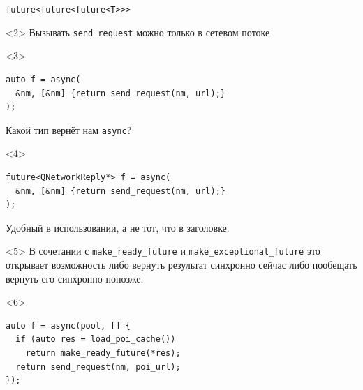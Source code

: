 \documentclass[aspectratio=169,hyperref={unicode},17pt]{beamer}
\begin{document}
\begin{frame}[fragile,t]{\texttt{future<future<future<T>{}>{}>}}
\begin{onlyenv}<2>
Вызывать \texttt{send\_request} можно только в сетевом потоке
\end{onlyenv}
\begin{onlyenv}<3>
\begin{lstlisting}[style=cppcode]
auto f = async(
  &nm, [&nm] {return send_request(nm, url);}
);
\end{lstlisting}
Какой тип вернёт нам \texttt{async}?
\end{onlyenv}
\begin{onlyenv}<4>
\begin{lstlisting}[style=cppcode]
future<QNetworkReply*> f = async(
  &nm, [&nm] {return send_request(nm, url);}
);
\end{lstlisting}
Удобный в использовании, а не тот, что в заголовке.
\end{onlyenv}
\begin{onlyenv}<5>
В сочетании с \texttt{make\_ready\_future} и \texttt{make\_exceptional\_future} это открывает возможность либо вернуть результат синхронно сейчас либо пообещать вернуть его синхронно попозже.
\end{onlyenv}
\begin{onlyenv}<6>
\begin{lstlisting}[style=cppcode]
auto f = async(pool, [] {
  if (auto res = load_poi_cache())
    return make_ready_future(*res);
  return send_request(nm, poi_url);
});
\end{lstlisting}
\end{onlyenv}
\end{frame}
\end{document}
